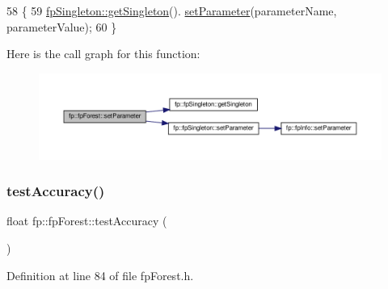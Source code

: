 \begin{DoxyCode}
58                                                                                               \{
59                 \hyperlink{classfp_1_1fpSingleton_a8bdae77b68521003e3fc630edec2e240}{fpSingleton::getSingleton}().
      \hyperlink{classfp_1_1fpSingleton_a90f275b256694ea7b16577d547a33044}{setParameter}(parameterName, parameterValue);    
60             \}
\end{DoxyCode}
Here is the call graph for this function\+:\nopagebreak
\begin{figure}[H]
\begin{center}
\leavevmode
\includegraphics[width=350pt]{classfp_1_1fpForest_a8a083cc4cd4110dee2b6627d53529965_cgraph}
\end{center}
\end{figure}
\mbox{\label{classfp_1_1fpForest_a2ecaa11b48f37781f5fb4607ed6a490f}} 
\subsubsection{\texorpdfstring{test\+Accuracy()}{testAccuracy()}}
{\footnotesize\ttfamily float fp\+::fp\+Forest\+::test\+Accuracy (\begin{DoxyParamCaption}{ }\end{DoxyParamCaption})\hspace{0.3cm}{\ttfamily [inline]}}



Definition at line 84 of file fp\+Forest.\+h.


